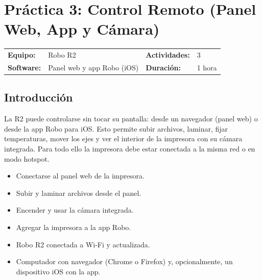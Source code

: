 \chapter{Práctica 3: Control Remoto (Panel Web, App y Cámara)}

\begin{center}
  \small\renewcommand{\arraystretch}{1.3}
  \begin{tabular}{l l l l}
    \textbf{Equipo:}      & Robo R2   &
    \textbf{Actividades:} & 3 \\
    \textbf{Software:}    & Panel web y app Robo (iOS) &
    \textbf{Duración:}    & 1 hora \\
  \end{tabular}
\end{center}

\section{Introducción}

La R2 puede controlarse sin tocar su pantalla: desde un navegador (panel web) o desde la app Robo para iOS. Esto permite subir archivos, laminar, fijar temperaturas, mover los ejes y ver el interior de la impresora con su cámara integrada. Para todo ello la impresora debe estar conectada a la misma red o en modo hotspot.

\begin{objetivebox}
\begin{itemize}
    \item Conectarse al panel web de la impresora.
    \item Subir y laminar archivos desde el panel.
    \item Encender y usar la cámara integrada.
    \item Agregar la impresora a la app Robo.
\end{itemize}
\end{objetivebox}

\vspace{6pt}

\begin{materialbox}
\begin{itemize}
    \item Robo R2 conectada a Wi-Fi y actualizada.
    \item Computador con navegador (Chrome o Firefox) y, opcionalmente, un dispositivo iOS con la app.
\end{itemize}
\end{materialbox}

